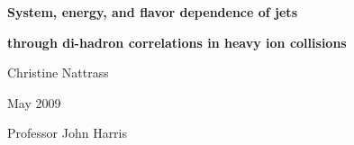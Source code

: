 \documentclass[12pt]{article}
\begin{document}
%

%
\vspace{12pt}

\vspace{5cm}

\centerline{\textbf{System, energy, and flavor dependence of jets}}
\centerline{\textbf{through di-hadron correlations in heavy ion collisions}}

\centerline{Christine Nattrass}
\centerline{May 2009} 
\centerline{Professor John Harris}

% 

\vspace{12pt}


\end{document}
